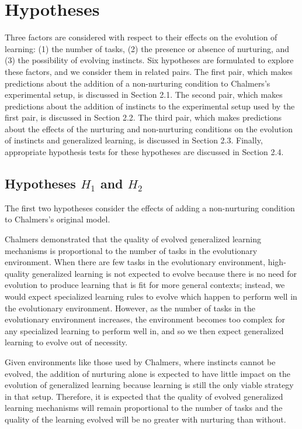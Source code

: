 \documentclass[master]{outhesis}
\begin{document}
\chapter{Hypotheses}

Three factors are considered with respect to their effects on the evolution of learning:
(1) the number of tasks,
(2) the presence or absence of nurturing, and
(3) the possibility of evolving instincts.
Six hypotheses are formulated to explore these factors,
and we consider them in related pairs.
The first pair, which makes predictions about the addition of a non-nurturing condition to Chalmers's experimental setup, is discussed in Section 2.1.
The second pair, which makes predictions about the addition of instincts to the experimental setup used by the first pair, is discussed in Section 2.2.
The third pair, which makes predictions about the effects of the nurturing and non-nurturing conditions on the evolution of instincts and generalized learning, is discussed in Section 2.3.
Finally, appropriate hypothesis tests for these hypotheses are discussed in Section 2.4.

\section{Hypotheses $H_1$ and $H_2$}

The first two hypotheses consider the effects of adding a non-nurturing condition to Chalmers's original model.

Chalmers demonstrated that the quality of evolved generalized learning mechanisms is proportional to the number of tasks in the evolutionary environment. When there are few tasks in the evolutionary environment, high-quality generalized learning is not expected to evolve
because there is no need for evolution to produce learning that is fit for more general contexts;
instead, we would expect specialized learning rules to evolve which happen to perform well in the evolutionary environment.
However, as the number of tasks in the evolutionary environment increases,
the environment becomes too complex for any specialized learning to perform well in,
and so we then expect generalized learning to evolve out of necessity.

Given environments like those used by Chalmers, where instincts cannot be evolved, the addition of nurturing alone is expected to have little impact on the evolution of generalized learning because learning is still the only viable strategy in that setup. Therefore, it is expected that the quality of evolved generalized learning mechanisms will remain proportional to the number of tasks and the quality of the learning evolved will be no greater with nurturing than without.
\end{document}
